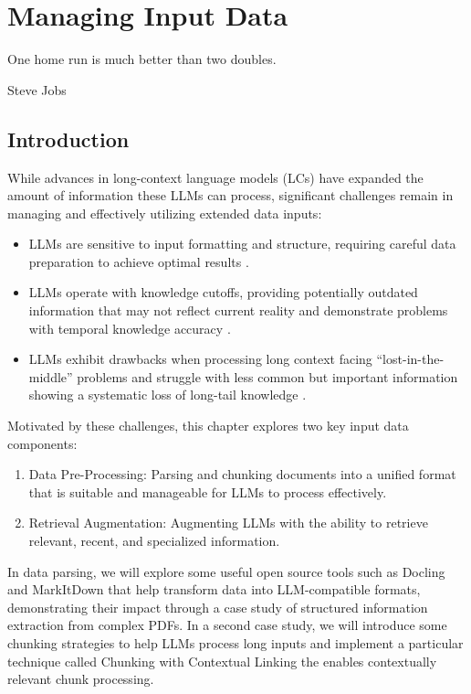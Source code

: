 \setchapterpreamble[u]{\margintoc}
\chapter{Managing Input Data}
\label{chapter:input}

\epigraph{One home run is much better than two doubles.}{Steve Jobs}
\section{Introduction}

While advances in long-context language models (LCs) \cite{lee2024longcontextlanguagemodelssubsume} have expanded the amount of information these LLMs can process, significant challenges remain in managing and effectively utilizing extended data inputs:

\begin{itemize}
    \item LLMs are sensitive to input formatting and structure, requiring careful data preparation to achieve optimal results \cite{he2024doespromptformattingimpact, liu2024enhancingllmscognitionstructurization, tan2024htmlraghtmlbetterplain}.
    \item LLMs operate with knowledge cutoffs, providing potentially outdated information that may not reflect current reality and demonstrate problems with temporal knowledge accuracy \cite{amayuelas-etal-2024-knowledge}.
    \item LLMs exhibit drawbacks when processing long context facing ``lost-in-the-middle'' problems \cite{wu2024longdocumentsummaryevaluation} and struggle with less common but important information showing a systematic loss of long-tail knowledge \cite{kotha2024understanding}.
\end{itemize}

Motivated by these challenges, this chapter explores two key input data components:

\begin{enumerate}
    \item Data Pre-Processing: Parsing and chunking documents into a unified format that is suitable and manageable for LLMs to process effectively.
    \item Retrieval Augmentation: Augmenting LLMs with the ability to retrieve relevant, recent, and specialized information.
\end{enumerate}

In data parsing, we will explore some useful open source tools such as Docling and MarkItDown that help transform data into LLM-compatible formats, demonstrating their impact through a case study of structured information extraction from complex PDFs. In a second case study, we will introduce some chunking strategies to help LLMs process long inputs and implement a particular technique called Chunking with Contextual Linking the enables contextually relevant chunk processing.

